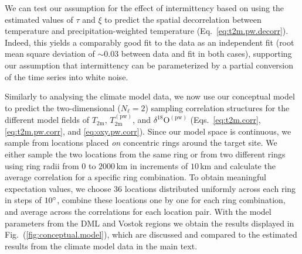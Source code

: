 \documentclass[cp]{copernicus}
\begin{document}
We can test our assumption for the effect of intermittency based on using the
estimated values of $\tau$ and $\xi$ to predict the spatial decorrelation
between temperature and precipitation-weighted temperature
(Eq.~\ref{eq:t2m.pw.decorr}). Indeed, this yields a comparably good fit to the
data as an independent fit (root mean square deviation of $\sim0.03$ between
data and fit in both cases), supporting our assumption that intermittency can be
parameterized by a partial conversion of the time series into white noise.

Similarly to analysing the climate model data, we now use our conceptual model
to predict the two-dimensional ($N_{\ell}=2$) sampling correlation structures
for the different model fields of $T_{\mathrm{2m}}$,
$T_{\mathrm{2m}}^{\mathrm{(pw)}}$, and $\delta^{18}\mathrm{O}^{\mathrm{(pw)}}$
(Eqs.~\ref{eq:t2m.corr}, \ref{eq:t2m.pw.corr}, and \ref{eq:oxy.pw.corr}). Since
our model space is continuous, we sample from locations placed \emph{on}
concentric rings around the target site. We either sample the two locations from
the same ring or from two different rings using ring radii from $0$ to
$2000$\,km in increments of $10$\,km and calculate the average correlation for a
specific ring combination. To obtain meaningful expectation values, we choose
$36$ locations distributed uniformly across each ring in steps of $10^{\circ}$,
combine these locations one by one for each ring combination, and average across
the correlations for each location pair. With the model parameters from the DML
and Vostok regions we obtain the results displayed in
Fig.~(\ref{fig:conceptual.model}), which are discussed and compared to the
estimated results from the climate model data in the main text.

\noappendix

\hack{\clearpage}


\end{document}
